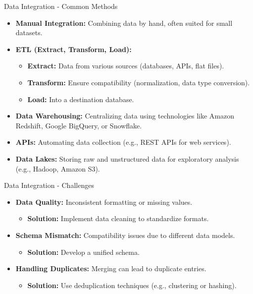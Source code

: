 \documentclass[aspectratio=169]{beamer}
\begin{document}
\begin{frame}[fragile]{Data Integration - Common Methods}
    \begin{itemize}
        \item \textbf{Manual Integration:} Combining data by hand, often suited for small datasets. 
        \item \textbf{ETL (Extract, Transform, Load):} 
        \begin{itemize}
            \item \textbf{Extract:} Data from various sources (databases, APIs, flat files).
            \item \textbf{Transform:} Ensure compatibility (normalization, data type conversion).
            \item \textbf{Load:} Into a destination database.
        \end{itemize}
        \item \textbf{Data Warehousing:} Centralizing data using technologies like Amazon Redshift, Google BigQuery, or Snowflake.
        \item \textbf{APIs:} Automating data collection (e.g., REST APIs for web services).
        \item \textbf{Data Lakes:} Storing raw and unstructured data for exploratory analysis (e.g., Hadoop, Amazon S3).
    \end{itemize}
\end{frame}

\begin{frame}[fragile]{Data Integration - Challenges}
    \begin{itemize}
        \item \textbf{Data Quality:} Inconsistent formatting or missing values.
            \begin{itemize}
                \item \textbf{Solution:} Implement data cleaning to standardize formats.
            \end{itemize}
        \item \textbf{Schema Mismatch:} Compatibility issues due to different data models. 
            \begin{itemize}
                \item \textbf{Solution:} Develop a unified schema.
            \end{itemize}
        \item \textbf{Handling Duplicates:} Merging can lead to duplicate entries.
            \begin{itemize}
                \item \textbf{Solution:} Use deduplication techniques (e.g., clustering or hashing).
            \end{itemize}
    \end{itemize}
\end{frame}
\end{document}
